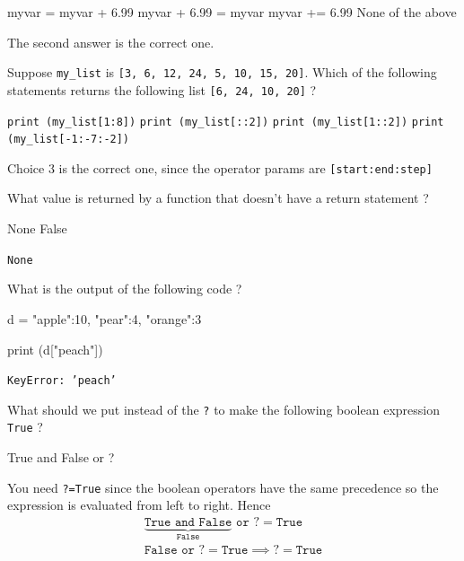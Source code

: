 \documentclass[12pt,a4paper]{exam}
\begin{document}
\begin{questions}
\begin{checkboxes}
\choice myvar = myvar + 6.99
\choice myvar + 6.99 = myvar
\choice myvar += 6.99
\choice None of the above
\end{checkboxes}
\begin{solution}
The second answer is the correct one.
\end{solution}
\question
Suppose \texttt{my\_list} is \texttt{[3, 6, 12, 24, 5, 10, 15, 20]}.
Which of the following statements returns the following list \texttt{[6, 24, 10, 20]} ?

\begin{checkboxes}
\choice \texttt{print (my\_list[1:8])}
\choice \texttt{print (my\_list[::2])}
\choice \texttt{print (my\_list[1::2])}
\choice \texttt{print (my\_list[-1:-7:-2])}
\end{checkboxes}
\begin{solution}
Choice 3 is the correct one, since the operator params are \texttt{[start:end:step]}
\end{solution}
\question
What value is returned by a function that doesn't have a return statement ?

\begin{checkboxes}
\choice None
\choice False
\end{checkboxes}
\begin{solution}
\texttt{None}
\end{solution}
\question
What is the output of the following code ?

\begin{ipython}
d = {"apple":10, "pear":4, "orange":3}

print (d["peach"])
\end{ipython}
\makeemptybox{3cm}
\begin{solution}
\texttt{KeyError: 'peach'}
\end{solution}
\question
What should we put instead of the \texttt{?} to make the following boolean expression \texttt{True} ?
\begin{ipython}
True and False or ?
\end{ipython}
\fillwithlines{3cm}
\begin{solution}
You need \texttt{?=True} since the boolean operators have the same precedence so the expression is evaluated from left to right.
Hence
\begin{equation*}
  \begin{gathered}
    \underbrace{\texttt{True and False}}_{\texttt{False}}\texttt{ or ?} = \texttt{True} \\
    \texttt{False or ?} = \texttt{True} \implies \texttt{?} = \texttt{True} \\
    \end{gathered}
\end{equation*}
\end{solution}


\end{questions}
\end{document}
